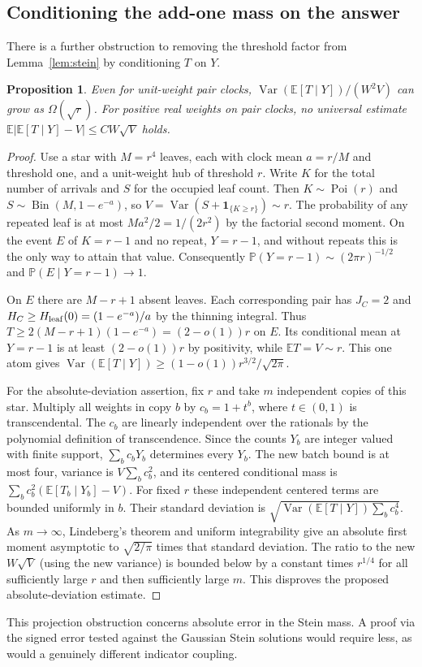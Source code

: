\documentclass[11pt]{article}
\newtheorem{prop}[theorem]{Proposition}
\newcommand{\E}{\mathbb E}
\newcommand{\Prb}{\mathbb P}
\newcommand{\Var}{\operatorname{Var}}
\newcommand{\Poi}{\operatorname{Poi}}
\newcommand{\ind}{\mathbf1}
\numberwithin{equation}{section}
\begin{document}
\subsection*{Conditioning the add-one mass on the answer}
There is a further obstruction to removing the threshold factor from
Lemma~\ref{lem:stein} by conditioning $T$ on $Y$.
\begin{prop}\label{prop:projected}
Even for unit-weight pair clocks, $\Var(\E[T\mid Y])/(W^2V)$ can grow as
$\Omega(\sqrt r)$. For positive real weights on pair clocks, no universal
estimate $\E|\E[T\mid Y]-V|\le CW\sqrt V$ holds.
\end{prop}
\begin{proof}
Use a star with $M=r^4$ leaves, each with clock mean $a=r/M$ and threshold one,
and a unit-weight hub of threshold $r$. Write $K$ for the total number of
arrivals and $S$ for the occupied leaf count. Then $K\sim\Poi(r)$ and
$S\sim\operatorname{Bin}(M,1-e^{-a})$, so
$V=\Var(S+\ind_{\{K\ge r\}})\sim r$.
The probability of any repeated leaf is at most $Ma^2/2=1/(2r^2)$ by
the factorial second moment. On the event $E$ of $K=r-1$ and no repeat,
$Y=r-1$, and without repeats this is the only way to attain that value.
Consequently $\Prb(Y=r-1)\sim(2\pi r)^{-1/2}$ and $\Prb(E\mid Y=r-1)\to1$.

On $E$ there are $M-r+1$ absent leaves. Each corresponding pair has $J_C=2$
and $H_C\ge H_{\rm leaf}(0)=(1-e^{-a})/a$ by the thinning integral.
Thus $T\ge2(M-r+1)(1-e^{-a})=(2-o(1))r$ on $E$.
Its conditional mean at $Y=r-1$ is at least $(2-o(1))r$ by positivity,
while $\E T=V\sim r$. This one atom gives
$\Var(\E[T\mid Y])\ge(1-o(1))r^{3/2}/\sqrt{2\pi}$.

For the absolute-deviation assertion, fix $r$ and take $m$ independent copies
of this star. Multiply all weights in copy $b$ by $c_b=1+t^b$, where $t\in(0,1)$
is transcendental. The $c_b$ are linearly independent over the rationals
by the polynomial definition of transcendence. Since the counts $Y_b$ are
integer valued with finite support, $\sum_b c_bY_b$ determines every $Y_b$.
The new batch bound is at most four, variance is $V\sum_b c_b^2$, and its centered
conditional mass is $\sum_b c_b^2(\E[T_b\mid Y_b]-V)$.
For fixed $r$ these independent centered terms are bounded uniformly in $b$.
Their standard deviation is $\sqrt{\Var(\E[T\mid Y])\sum_b c_b^4}$.
As $m\to\infty$, Lindeberg's theorem and uniform integrability give an
absolute first moment asymptotic to $\sqrt{2/\pi}$ times that standard
deviation. The ratio to the new $W\sqrt V$ (using the new variance)
is bounded below by a constant times $r^{1/4}$ for all sufficiently large $r$
and then sufficiently large $m$. This disproves the proposed absolute-deviation estimate.
\end{proof}
This projection obstruction concerns absolute error in the Stein mass.
A proof via the signed error tested against the Gaussian Stein solutions
would require less, as would a genuinely different indicator coupling.
\end{document}
